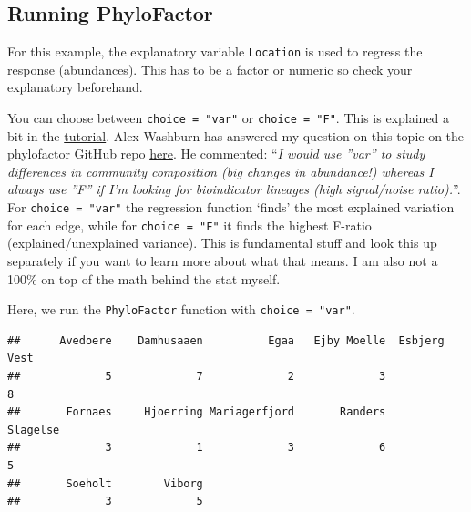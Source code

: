 \documentclass[
]{book}
\newenvironment{Shaded}{\begin{snugshade}}{\end{snugshade}}
\newcommand{\CommentTok}[1]{\textcolor[rgb]{0.56,0.35,0.01}{\textit{#1}}}
\newcommand{\FunctionTok}[1]{\textcolor[rgb]{0.00,0.00,0.00}{#1}}
\newcommand{\NormalTok}[1]{#1}
\newcommand{\OtherTok}[1]{\textcolor[rgb]{0.56,0.35,0.01}{#1}}
\newcommand{\SpecialCharTok}[1]{\textcolor[rgb]{0.00,0.00,0.00}{#1}}
\begin{document}
\hypertarget{running-phylofactor}{%
\subsection{Running PhyloFactor}\label{running-phylofactor}}

For this example, the explanatory variable \texttt{Location} is used to regress the response (abundances). This has to be a factor or numeric so check your explanatory beforehand.

You can choose between \texttt{choice\ =\ "var"} or \texttt{choice\ =\ "F"}. This is explained a bit in the \href{https://docs.wixstatic.com/ugd/0119a1_099ae20df8424af9a38585dcebc0d45a.pdf}{tutorial}. Alex Washburn has answered my question on this topic on the phylofactor GitHub repo \href{https://github.com/reptalex/phylofactor/issues/39}{here}. He commented: ``\emph{I would use ''var'' to study differences in community composition (big changes in abundance!) whereas I always use ''F'' if I'm looking for bioindicator lineages (high signal/noise ratio).}''. For \texttt{choice\ =\ "var"} the regression function `finds' the most explained variation for each edge, while for \texttt{choice\ =\ "F"} it finds the highest F-ratio (explained/unexplained variance). This is fundamental stuff and look this up separately if you want to learn more about what that means. I am also not a 100\% on top of the math behind the stat myself.

Here, we run the \texttt{PhyloFactor} function with \texttt{choice\ =\ "var"}.

\begin{Shaded}
\end{Shaded}

\begin{verbatim}
##      Avedoere    Damhusaaen          Egaa   Ejby Moelle  Esbjerg Vest 
##             5             7             2             3             8 
##       Fornaes     Hjoerring Mariagerfjord       Randers      Slagelse 
##             3             1             3             6             5 
##       Soeholt        Viborg 
##             3             5
\end{verbatim}
\end{document}
